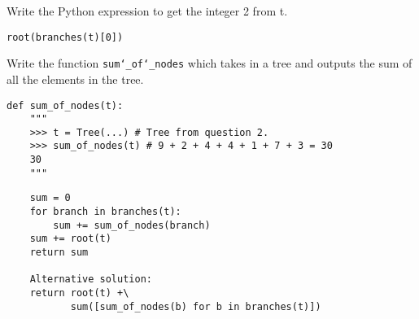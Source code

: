 \documentclass{exam}
\begin{document}
\begin{questions}
\begin{blocksection}
\question Write the Python expression to get the integer 2 from t.

\begin{solution}[0.25in]
\begin{lstlisting}
root(branches(t)[0])
\end{lstlisting}
\end{solution}

\end{blocksection}

\begin{blocksection}
\question Write the function \texttt{sum\char`_of\char`_nodes} which takes in a
tree and outputs the sum of all the elements in the tree.
\end{blocksection}

\begin{lstlisting}
def sum_of_nodes(t):
    """
    >>> t = Tree(...) # Tree from question 2.
    >>> sum_of_nodes(t) # 9 + 2 + 4 + 4 + 1 + 7 + 3 = 30
    30
    """
\end{lstlisting}
\begin{solution}[4in]
\begin{lstlisting}
    sum = 0
    for branch in branches(t):
        sum += sum_of_nodes(branch)
    sum += root(t)
    return sum

    Alternative solution:
    return root(t) +\
           sum([sum_of_nodes(b) for b in branches(t)])
\end{lstlisting}
\end{solution}

\end{questions}

\end{document}
